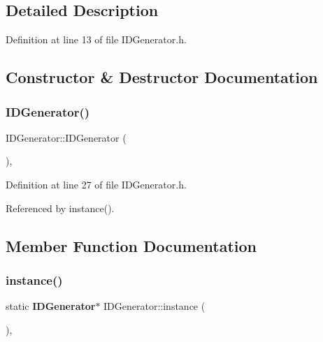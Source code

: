 \subsection{Detailed Description}


Definition at line 13 of file I\+D\+Generator.\+h.



\subsection{Constructor \& Destructor Documentation}
\mbox{\label{class_i_d_generator_a8209b55f50b469c47f977660a769b1da}} 
\subsubsection{I\+D\+Generator()}
{\footnotesize\ttfamily I\+D\+Generator\+::\+I\+D\+Generator (\begin{DoxyParamCaption}{ }\end{DoxyParamCaption})\hspace{0.3cm}{\ttfamily [inline]}, {\ttfamily [private]}}



Definition at line 27 of file I\+D\+Generator.\+h.



Referenced by instance().



\subsection{Member Function Documentation}
\mbox{\label{class_i_d_generator_ad852c6dadc89e1020e4b3932f5a97bb3}} 
\subsubsection{instance()}
{\footnotesize\ttfamily static \textbf{ I\+D\+Generator}$\ast$ I\+D\+Generator\+::instance (\begin{DoxyParamCaption}{ }\end{DoxyParamCaption})\hspace{0.3cm}{\ttfamily [inline]}, {\ttfamily [static]}}



